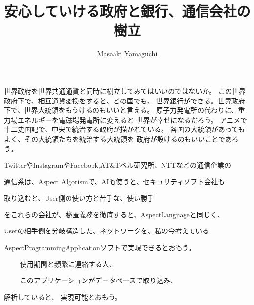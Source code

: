 \documentclass{jsarticle}
\begin{document}
\title{安心していける政府と銀行、通信会社の樹立}
\author{Masaaki Yamaguchi}
\date{}
\maketitle

         世界政府を世界共通通貨と同時に樹立してみてはいいのではないか。
     この世界政府下で、相互通貨変換をすると、どの国でも、
     世界銀行ができる。世界政府下で、世界大統領をもうけるのもいいと言える。
     原子力発電所の代わりに、重力場エネルギーを電磁場発電所に変えると
     世界が幸せになるだろう。
     アニメで十二史国記で、中央で統治する政府が描かれている。
     各国の大統領があってもよく、その大統領たちを統治する大統領を
     政府が設けるのもいいことであろう。

	 TwitterやInstagramやFacebook,AT$ \& $Tベル研究所、NTTなどの通信企業の

     通信系は、Aspect Algorismで、AIも使うと、セキュリティソフト会社も

     取り込むと、User側の使い方と苦手な、使い勝手

     をこれらの会社が、秘匿義務を徹底すると、AspectLanguageと同じく、

     Userの相手側を分岐構造した、ネットワークを、私の今考えている

     AspectProgrammingApplicationソフトで実現できるとおもう。

　　 使用期間と頻繁に連絡する人、　

　　 このアプリケーションがデータベースで取り込み、

     解析していると、 実現可能とおもう。
\end{document}
